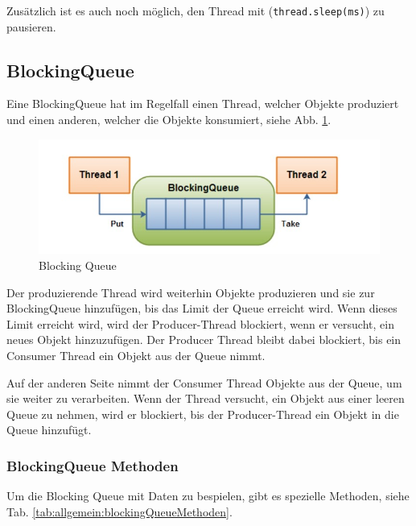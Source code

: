 Zusätzlich ist es auch noch möglich, den Thread mit (\texttt{thread.sleep(ms)}) zu pausieren. \cite{javaInselBuch}

\subsection{BlockingQueue}
 
Eine BlockingQueue hat im Regelfall einen Thread, welcher Objekte produziert und einen anderen, welcher die Objekte konsumiert, siehe Abb. \ref{fig:impl:BlockingQueue}.
 
\begin{figure}[h t]
    \centering
    \includegraphics[scale=0.5]{pics/blockingQueue.jpg}
    \caption{Blocking Queue \cite{javaBlockingQueue}}
    \label{fig:impl:BlockingQueue}
\end{figure}
 
Der produzierende Thread wird weiterhin Objekte produzieren und sie zur BlockingQueue hinzufügen, bis das Limit der Queue erreicht wird. Wenn dieses Limit erreicht wird, wird der Producer-Thread blockiert, wenn er versucht, ein neues Objekt hinzuzufügen. Der Producer Thread bleibt dabei blockiert, bis ein Consumer Thread ein Objekt aus der Queue nimmt.
 
Auf der anderen Seite nimmt der Consumer Thread Objekte aus der Queue, um sie weiter zu verarbeiten. Wenn der Thread versucht, ein Objekt aus einer leeren Queue zu nehmen, wird er blockiert, bis der Producer-Thread ein Objekt in die Queue hinzufügt. \cite{javaBlockingQueue}
 
\subsubsection{BlockingQueue Methoden}
Um die Blocking Queue mit Daten zu bespielen, gibt es spezielle Methoden, siehe Tab. \ref{tab:allgemein:blockingQueueMethoden}.
 
